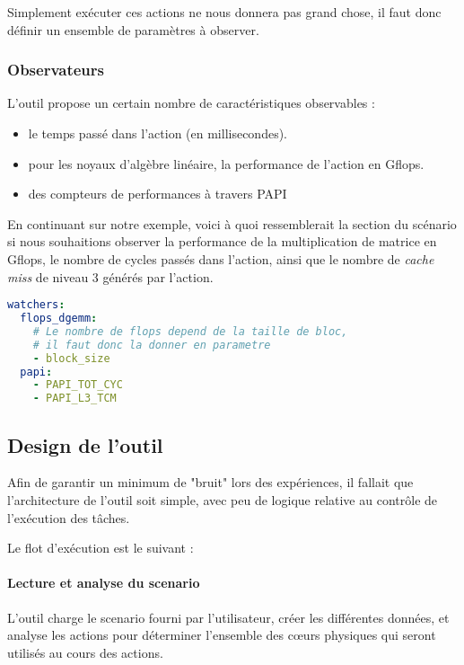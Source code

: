 Simplement exécuter ces actions ne nous donnera pas grand chose, il faut donc définir un ensemble de paramètres à observer.

\subsubsection{Observateurs}

L'outil propose un certain nombre de caractéristiques observables :

\begin{itemize}
  \item le temps passé dans l'action (en millisecondes).
  \item pour les noyaux d'algèbre linéaire, la performance de l'action en Gflops.
  \item des compteurs de performances à travers PAPI
\end{itemize}

En continuant sur notre exemple, voici à quoi ressemblerait la section du scénario si nous souhaitions observer la performance de la multiplication de matrice en Gflops, le nombre de cycles passés dans l'action, ainsi que le nombre de \emph{cache miss} de niveau 3 générés par l'action.

\begin{lstlisting}[language=yaml,caption=Exemple de déclaration d'observateurs,label=lst:tool:watchers-example]
watchers:
  flops_dgemm:
    # Le nombre de flops depend de la taille de bloc,
    # il faut donc la donner en parametre
    - block_size
  papi:
    - PAPI_TOT_CYC
    - PAPI_L3_TCM
\end{lstlisting}

\subsection{Design de l'outil}

Afin de garantir un minimum de "bruit" lors des expériences, il fallait que l'architecture de l'outil soit simple, avec peu de logique relative au contrôle de l'exécution des tâches.

Le flot d'exécution est le suivant :

\paragraph{Lecture et analyse du scenario}
L'outil charge le scenario fourni par l'utilisateur, créer les différentes données, et analyse les actions pour déterminer l'ensemble des cœurs physiques qui seront utilisés au cours des actions.

